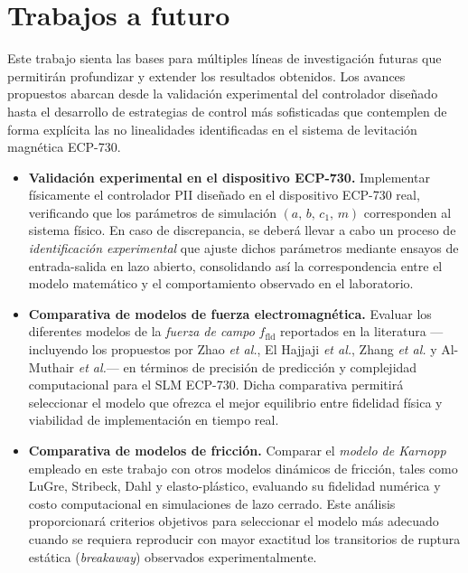 \section{Trabajos a futuro}

Este trabajo sienta las bases para múltiples líneas de investigación futuras que permitirán
profundizar y extender los resultados obtenidos. Los avances propuestos abarcan desde la
validación experimental del controlador diseñado hasta el desarrollo de estrategias de control
más sofisticadas que contemplen de forma explícita las no linealidades identificadas en el
sistema de levitación magnética ECP-730.

\begin{itemize}

    \item \textbf{Validación experimental en el dispositivo ECP-730.}
    Implementar físicamente el controlador PII diseñado en el dispositivo ECP-730 real,
    verificando que los parámetros de simulación $(a,\, b,\, c_1,\, m)$ corresponden al
    sistema físico. En caso de discrepancia, se deberá llevar a cabo un proceso de
    \emph{identificación experimental} que ajuste dichos parámetros mediante ensayos de
    entrada-salida en lazo abierto, consolidando así la correspondencia entre el modelo
    matemático y el comportamiento observado en el laboratorio.

    \item \textbf{Comparativa de modelos de fuerza electromagnética.}
    Evaluar los diferentes modelos de la \emph{fuerza de campo} $f_{\mathrm{fld}}$
    reportados en la literatura ---incluyendo los propuestos por Zhao \textit{et al.},
    El Hajjaji \textit{et al.}, Zhang \textit{et al.} y Al-Muthair \textit{et al.}---
    en términos de precisión de predicción y complejidad computacional para el SLM ECP-730.
    Dicha comparativa permitirá seleccionar el modelo que ofrezca el mejor equilibrio entre
    fidelidad física y viabilidad de implementación en tiempo real.

    \item \textbf{Comparativa de modelos de fricción.}
    Comparar el \emph{modelo de Karnopp} empleado en este trabajo con otros modelos
    dinámicos de fricción, tales como LuGre, Stribeck, Dahl y elasto-plástico, evaluando
    su fidelidad numérica y costo computacional en simulaciones de lazo cerrado. Este
    análisis proporcionará criterios objetivos para seleccionar el modelo más adecuado cuando
    se requiera reproducir con mayor exactitud los transitorios de ruptura estática
    (\textit{breakaway}) observados experimentalmente.


\end{itemize}
